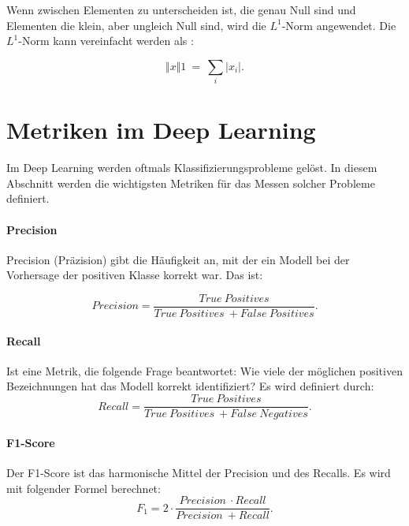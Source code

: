 Wenn zwischen Elementen zu unterscheiden ist, die genau Null sind und Elementen die klein, aber ungleich Null sind, wird die $L^1$-Norm angewendet. Die $L^1$-Norm kann vereinfacht werden als \cite*[40]{IanGoodfellowYoshuaBengio2016}:

\begin{equation} \label{FormelNorm1}
    \Vert x\Vert 1\ =\ \sum _{i}\bigr| x_{i}\bigr|.
\end{equation}

\section{Metriken im Deep Learning}
Im Deep Learning werden oftmals Klassifizierungsprobleme gelöst. In diesem Abschnitt werden die wichtigsten Metriken für das Messen solcher Probleme definiert.
\paragraph{Precision}
Precision (Präzision) gibt die Häufigkeit an, mit der ein Modell bei der Vorhersage der positiven Klasse korrekt war. Das ist:

\begin{equation} \label{Preci}
             Precision =  \frac{True\ Positives}{True\ Positives\ + False\ Positives}.
        \end{equation}
        
\paragraph{Recall}
Ist eine Metrik, die folgende Frage beantwortet: Wie viele der möglichen positiven Bezeichnungen hat das Modell korrekt identifiziert? Es wird definiert durch:
\begin{equation} \label{Recall}
             Recall =  \frac{True\ Positives}{True\ Positives\ + False\ Negatives}.
        \end{equation}


\paragraph{F1-Score}
Der F1-Score ist das harmonische Mittel der Precision und des Recalls. Es wird mit folgender Formel berechnet:
\begin{equation} \label{F1Score}
             F_1 =  2 \cdot \frac{Precision\ \cdot Recall}{Precision\  + Recall}.
        \end{equation}
        

